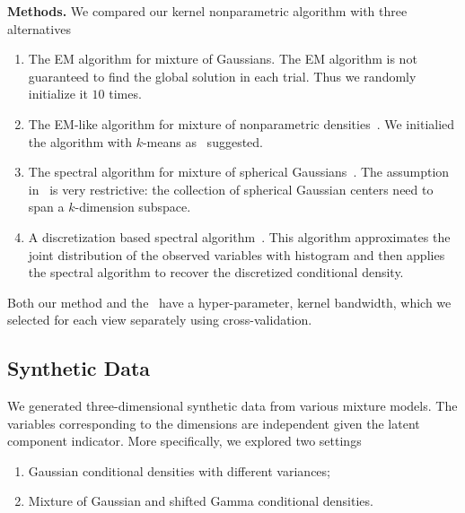 \documentclass{article}
\begin{document}
{\bf Methods.} We compared our kernel nonparametric algorithm with three alternatives
\begin{enumerate}
  \vspace{-1mm}
  \item The EM algorithm for mixture of Gaussians. The EM algorithm is not guaranteed to find the global solution in each trial. Thus we randomly initialize it $10$ times.
  \item The EM-like algorithm for mixture of nonparametric densities~\citep{BenChaHun09}. We initialied the algorithm with $k$-means as~\citet{BenChaHun09} suggested.
  \item The spectral algorithm for mixture of spherical Gaussians~\citep{HsuKak13}. The assumption in~\citet{HsuKak13} is very restrictive: the collection of spherical Gaussian centers need to span a $k$-dimension subspace.
  \item A discretization based spectral algorithm~\citep{HirKat10}. This algorithm approximates the joint distribution of the observed variables with histogram and then applies the spectral algorithm to recover the discretized conditional density.
  \vspace{-1mm}
\end{enumerate}
Both our method and the~\cite{BenChaHun09} have a hyper-parameter, kernel bandwidth, which we selected for each view separately using cross-validation.

\vspace{-3mm}
\subsection{Synthetic Data}
\vspace{-3mm}

We generated three-dimensional synthetic data from various mixture models. The variables corresponding to the dimensions are independent given the latent component indicator. More specifically, we explored two settings
\begin{enumerate}
  \item Gaussian conditional densities with different variances;
  \item Mixture of Gaussian and shifted Gamma conditional densities.
\end{enumerate}
\end{document}
